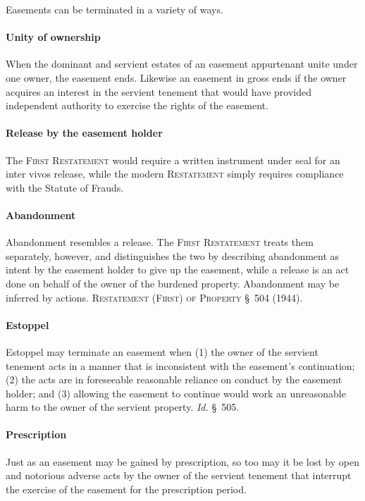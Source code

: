 Easements can be terminated in a variety of ways.

\paragraph{Unity of ownership} When the dominant and servient estates of an
easement appurtenant unite under one owner, the easement ends. Likewise an
easement in gross ends if the owner acquires an interest in the servient
tenement that would have provided independent authority to exercise the rights
of the easement.


\paragraph{Release by the easement holder} The \textsc{First Restatement}
would require a written instrument under seal for an inter vivos release, while
the modern \textsc{Restatement} simply requires compliance with the Statute of
Frauds.


\paragraph{Abandonment} Abandonment resembles a release. The \textsc{First
Restatement} treats them separately, however, and distinguishes the two by
describing abandonment as intent by the easement holder to give up the easement,
while a release is an act done on behalf of the owner of the burdened property.
Abandonment may be inferred by actions. \textsc{Restatement (First) of Property}
\S~504 (1944).


\paragraph{Estoppel} Estoppel may terminate an easement when (1) the owner of
the servient tenement acts in a manner that is inconsistent with the easement's
continuation; (2) the acts are in foreseeable reasonable reliance on conduct by
the easement holder; and (3) allowing the easement to continue would work an
unreasonable harm to the owner of the servient property. \textit{Id.} \S~505.


\paragraph{Prescription} Just as an easement may be gained by prescription,
so too may it be lost by open and notorious adverse acts by the owner of the
servient tenement that interrupt the exercise of the easement for the
prescription period.


